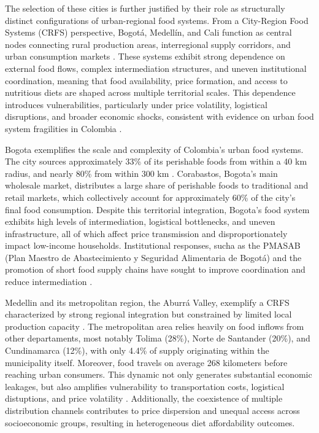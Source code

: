 \documentclass[Afour, sageh,times]{sagej}
\begin{document}
\smallskip

The selection of these cities is further justified by their role as structurally distinct configurations of urban-regional food systems. From a City-Region Food Systems (CRFS) perspective, Bogotá, Medellín, and Cali function as central nodes connecting rural production areas, interregional supply corridors, and urban consumption markets \citep{FAO2016CRFS, Armenia2019}. These systems exhibit strong dependence on external food flows, complex intermediation structures, and uneven institutional coordination, meaning that food availability, price formation, and access to nutritious diets are shaped across multiple territorial scales. This dependence introduces vulnerabilities, particularly under price volatility, logistical disruptions, and broader economic shocks, consistent with evidence on urban food system fragilities in Colombia \citep{Rankin2024, McCullumGomez2025}.

\smallskip


Bogota exemplifies the scale and complexity of Colombia's urban food systems. The city sources approximately 33\% of its perishable foods from within a 40 km radius, and nearly 80\% from within 300 km \citep{ReinaUsuga2020}. Corabastos, Bogota's main wholesale market, distributes a large share of perishable foods to traditional and retail markets, which collectively account for approximately 60\% of the city's final food consumption. Despite this territorial integration, Bogota's food system exhibits high levels of intermediation, logistical bottlenecks, and uneven infrastructure, all of which affect price transmission and disproportionately impact low-income households. Institutional responses, sucha as the PMASAB (Plan Maestro de Abastecimiento y Seguridad Alimentaria de Bogotá) and the promotion of short food supply chains have sought to improve coordination and reduce intermediation \citep{ReinaUsuga2022, Delgado2025}.

\smallskip

Medellin and its metropolitan region, the Aburrá Valley, exemplify a CRFS characterized by strong regional integration but constrained by limited local production capacity \citep{FAO2018MedellinCRFS}. The metropolitan area relies heavily on food inflows from other departaments, most notably Tolima (28\%), Norte de Santander (20\%), and Cundinamarca (12\%), with only 4.4\% of supply originating within the municipality itself. Moreover, food travels on average 268 kilometers before reaching urban consumers. This dynamic not only generates substantial economic leakages, but also amplifies vulnerability to transportation costs, logistical distuptions, and price volatility \citep{FAO2018MedellinCRFS}. Additionally, the coexistence of multiple distribution channels contributes to price dispersion and unequal access across socioeconomic groups, resulting in heterogeneous diet affordability outcomes.
\end{document}
